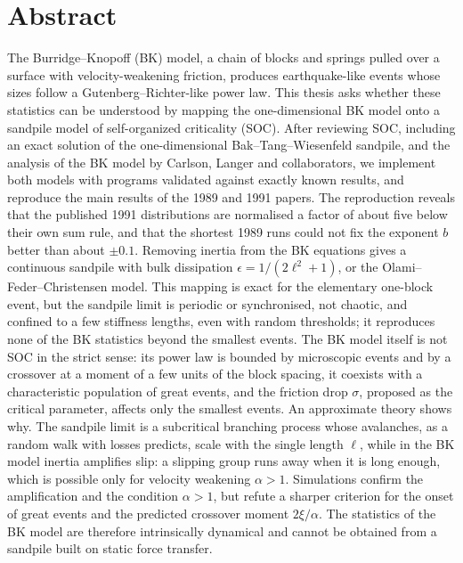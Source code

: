 \documentclass[11pt,a4paper,twoside,openright,parskip=half-,headings=optiontoheadandtoc]{scrreprt}
\theoremstyle{definition}
\begin{document}
\chapter*{Abstract}
The Burridge--Knopoff (BK) model, a chain of blocks and springs pulled over a surface with velocity-weakening friction, produces earthquake-like
events whose sizes follow a Gutenberg--Richter-like power law. This thesis asks whether these statistics can be understood by mapping the
one-dimensional BK model onto a sandpile model of self-organized criticality (SOC). After reviewing SOC, including an exact solution of the
one-dimensional Bak--Tang--Wiesenfeld sandpile, and the analysis of the BK model by Carlson, Langer and collaborators, we implement both models
with programs validated against exactly known results, and reproduce the main results of the 1989 and 1991 papers. The reproduction reveals that
the published 1991 distributions are normalised a factor of about five below their own sum rule, and that the shortest 1989 runs could not fix the
exponent $b$ better than about $\pm0.1$. Removing inertia from the BK equations gives a continuous sandpile with bulk dissipation
$\epsilon = 1/(2\ell^2+1)$, or the Olami--Feder--Christensen model. This mapping is exact for the elementary one-block event, but the sandpile limit
is periodic or synchronised, not chaotic, and confined to a few stiffness lengths, even with random thresholds; it reproduces none of the BK statistics
beyond the smallest events. The BK model itself is not SOC in the strict sense: its power law is bounded by microscopic events and by a crossover at a
moment of a few units of the block spacing, it coexists with a characteristic population of great events, and the friction drop $\sigma$, proposed as
the critical parameter, affects only the smallest events. An approximate theory shows why. The sandpile limit is a subcritical branching process
whose avalanches, as a random walk with losses predicts, scale with the single length $\ell$, while in the BK model inertia amplifies slip: a slipping
group runs away when it is long enough, which is possible only for velocity weakening $\alpha>1$. Simulations confirm the amplification and the
condition $\alpha>1$, but refute a sharper criterion for the onset of great events and the predicted crossover moment $2\xi/\alpha$. The statistics
of the BK model are therefore intrinsically dynamical and cannot be obtained from a sandpile built on static force transfer.

\tableofcontents



\cleardoublepage
{}










\printbibliography[heading=bibintoc]
\end{document}

